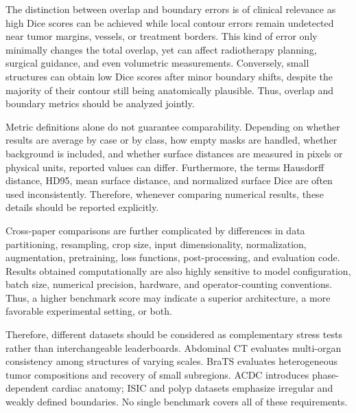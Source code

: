 \documentclass[5p,times,authoryear]{elsarticle}
\begin{document}
The distinction between overlap and boundary errors is of clinical relevance as high Dice scores can be achieved while local contour errors remain undetected near tumor margins, vessels, or treatment borders. This kind of error only minimally changes the total overlap, yet can affect radiotherapy planning, surgical guidance, and even volumetric measurements. Conversely, small structures can obtain low Dice scores after minor boundary shifts, despite the majority of their contour still being anatomically plausible. Thus, overlap and boundary metrics should be analyzed jointly.

Metric definitions alone do not guarantee comparability. Depending on whether results are average by case or by class, how empty masks are handled, whether background is included, and whether surface distances are measured in pixels or physical units, reported values can differ. Furthermore, the terms Hausdorff distance, HD95, mean surface distance, and normalized surface Dice are often used inconsistently. Therefore, whenever comparing numerical results, these details should be reported explicitly.

Cross-paper comparisons are further complicated by differences in data partitioning, resampling, crop size, input dimensionality, normalization, augmentation, pretraining, loss functions, post-processing, and evaluation code. Results obtained computationally are also highly sensitive to model configuration, batch size, numerical precision, hardware, and operator-counting conventions. Thus, a higher benchmark score may indicate a superior architecture, a more favorable experimental setting, or both.

Therefore, different datasets should be considered as complementary stress tests rather than interchangeable leaderboards. Abdominal CT evaluates multi-organ consistency among structures of varying scales. BraTS evaluates heterogeneous tumor compositions and recovery of small subregions. ACDC introduces phase-dependent cardiac anatomy; ISIC and polyp datasets emphasize irregular and weakly defined boundaries. No single benchmark covers all of these requirements.
\end{document}
